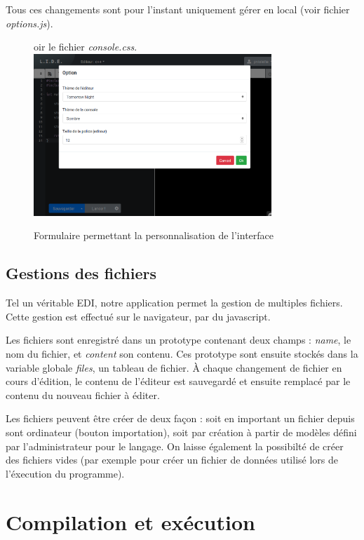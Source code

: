 Tous ces changements sont pour l'instant uniquement gérer en local (voir fichier \emph{options.js}).

\begin{figure}[!h]oir le fichier \emph{console.css}.
\centering
\includegraphics[width=0.8\textwidth]{./img/frontend/example_personnalisation.png}
\caption{Formulaire permettant la personnalisation de l'interface}
\end{figure}

\subsection{Gestions des fichiers}
Tel un véritable EDI, notre application permet la gestion de multiples fichiers. Cette gestion est effectué sur le navigateur, par du javascript.

Les fichiers sont enregistré dans un prototype contenant deux champs : \emph{name}, le nom du fichier, et \emph{content} son contenu. Ces prototype sont ensuite stockés dans la variable
globale \emph{files}, un tableau de fichier. À chaque changement de fichier en cours d'édition, le contenu de l'éditeur est sauvegardé et ensuite remplacé par le contenu du nouveau fichier à éditer.

Les fichiers peuvent être créer de deux façon : soit en important un fichier depuis sont ordinateur (bouton importation), soit par création à partir de modèles défini par l'administrateur pour le langage.
On laisse également la possibilté de créer des fichiers vides (par exemple pour créer un fichier de données utilisé lors de l'éxecution du programme).


\section{Compilation et exécution}


